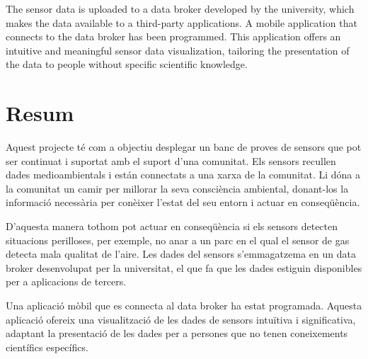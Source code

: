 \documentclass[12pt, a4paper,twoside]{tesi_upf}
\begin{document}
  The sensor data is uploaded to a data broker developed by the university, which makes the data available to a third-party applications. 
  A mobile application that connects to the data broker has been programmed. 
  This application offers an intuitive and meaningful sensor data visualization, tailoring the presentation of the data to people without specific scientific knowledge.


\section*{\Large \sffamily  Resum}

	Aquest projecte té com a objectiu desplegar un banc de proves de sensors que pot ser continuat i suportat amb el suport d'una comunitat.
	Els sensors recullen dades medioambientals i están connectats a una xarxa de la comunitat. Li dóna a la comunitat un camir per millorar la seva consciència ambiental, donant-los la informació necessària per conèixer l'estat del seu entorn i actuar en conseqüència. 
	
	D'aquesta manera tothom pot actuar en conseqüència si els sensors detecten situacions perilloses, per exemple, no anar a un parc en el qual el sensor de gas detecta mala qualitat de l'aire.
	Les dades del sensors s'emmagatzema en un data broker desenvolupat per la universitat, el que fa que les dades estiguin disponibles per a aplicacions de tercers.
	
	Una aplicació mòbil que es connecta al data broker ha estat programada. 
	Aquesta aplicació ofereix una visualització de les dades de sensors intuïtiva i significativa, adaptant la presentació de les dades per a persones que no tenen coneixements científics específics.


\cleardoublepage

%


\tableofcontents

\listoffigures

\listoftables
\end{document}
